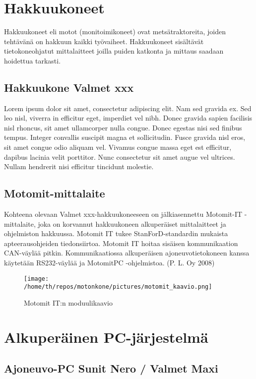 \documentclass[11pt,a4paper,oneside,article]{memoir}
\begin{document}
\section{Hakkuukoneet}

Hakkuukoneet eli motot (monitoimikoneet) ovat metsätraktoreita, joiden
tehtävänä on hakkuun kaikki työvaiheet. Hakkuukoneet sisältävät
tietokoneohjatut mittalaitteet joilla puiden katkonta ja mittaus saadaan
hoidettua tarkasti.

\subsection{Hakkuukone Valmet xxx}

Lorem ipsum dolor sit amet, consectetur adipiscing elit. Nam sed gravida
ex. Sed leo nisl, viverra in efficitur eget, imperdiet vel nibh. Donec
gravida sapien facilisis nisl rhoncus, sit amet ullamcorper nulla
congue. Donec egestas nisi sed finibus tempus. Integer convallis
suscipit magna et sollicitudin. Fusce gravida nisl eros, sit amet congue
odio aliquam vel. Vivamus congue massa eget est efficitur, dapibus
lacinia velit porttitor. Nunc consectetur sit amet augue vel ultrices.
Nullam hendrerit nisi efficitur tincidunt molestie.

\subsection{Motomit-mittalaite}

Kohteena olevaan Valmet xxx-hakkuukoneeseen on jälkiasennettu Motomit-IT
-mittalaite, joka on korvannut hakkuukoneen alkuperäiset mittalaitteet
ja ohjelmiston hakkuussa. Motomit IT tukee StanForD-standardin mukaista
apteerausohjeiden tiedonsiirtoa. Motomit IT hoitaa sisäisen
kommunikaation CAN-väylää pitkin. Kommunikaatiossa alkuperäisen
ajoneuvotietokoneen kanssa käytetään RS232-väylää ja MotomitPC
-ohjelmistoa. (P. L. Oy 2008)

\begin{figure}[H]
\centering
\texttt{[image: /home/th/repos/motonkone/pictures/motomit\_kaavio.png]}
\caption{Motomit IT:n moduulikaavio}
\end{figure}

\section{Alkuperäinen PC-järjestelmä}

\subsection{Ajoneuvo-PC Sunit Nero / Valmet Maxi}
\end{document}
